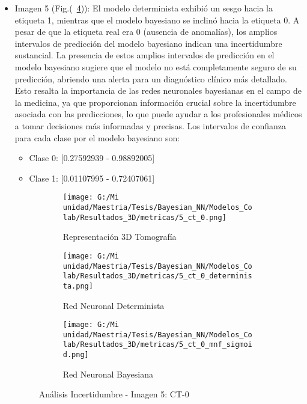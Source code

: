 \documentclass[10pt, oneside, a4paper]{article}
\begin{document}
\begin{itemize}
	\begin{itemize}
	\item Imagen 5 (Fig.(~\ref{fig:layout_5})): El modelo determinista exhibió un sesgo hacia la etiqueta 1, mientras que el modelo bayesiano se inclinó hacia la etiqueta 0. A pesar de que la etiqueta real era 0 (ausencia de anomalías), los amplios intervalos de predicción del modelo bayesiano indican una incertidumbre sustancial. La presencia de estos amplios intervalos de predicción en el modelo bayesiano sugiere que el modelo no está completamente seguro de su predicción, abriendo una alerta para un diagnóstico clínico más detallado. Esto resalta la importancia de las redes neuronales bayesianas en el campo de la medicina, ya que proporcionan información crucial sobre la incertidumbre asociada con las predicciones, lo que puede ayudar a los profesionales médicos a tomar decisiones más informadas y precisas.
	Los intervalos de confianza para cada clase por el modelo bayesiano son:
	\begin{itemize}
	\item Clase 0: [0.27592939 - 0.98892005] 
	\item Clase 1: [0.01107995 - 0.72407061]
	\end{itemize}

\begin{figure}[H]
	\centering
	\begin{subfigure}[b]{0.6\textwidth}
		\centering
		\texttt{[image: G:/Mi unidad/Maestria/Tesis/Bayesian\_NN/Modelos\_Colab/Resultados\_3D/metricas/5\_ct\_0.png]} %
		\caption{Representación 3D Tomografía}
		\label{fig:5_ct0_1}
	\end{subfigure}
	
	\medskip
	
	\begin{subfigure}[b]{0.45\textwidth}
		\centering
		\texttt{[image: G:/Mi unidad/Maestria/Tesis/Bayesian\_NN/Modelos\_Colab/Resultados\_3D/metricas/5\_ct\_0\_determinista.png]}
		\caption{Red Neuronal Determinista}
		\label{fig:5_ct0_2}
	\end{subfigure}
	\hfill
	\begin{subfigure}[b]{0.45\textwidth}
		\centering
		\texttt{[image: G:/Mi unidad/Maestria/Tesis/Bayesian\_NN/Modelos\_Colab/Resultados\_3D/metricas/5\_ct\_0\_mnf\_sigmoid.png]}
		\caption{Red Neuronal Bayesiana}
		\label{fig:5_ct0_3}
	\end{subfigure}
	
	\caption{Análisis Incertidumbre - Imagen 5: CT-0}
	\label{fig:layout_5}
\end{figure}
	

\end{itemize}
\end{itemize}
\end{document}

